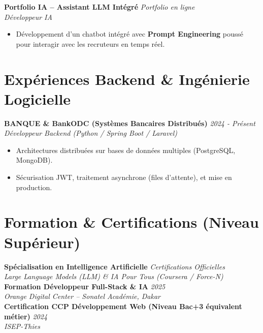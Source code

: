 \documentclass[10pt,a4paper]{article}
\begin{document}
\vspace{0.2cm}

\textbf{\color{dark} Portfolio IA -- Assistant LLM Intégré} \hfill \textit{Portfolio en ligne}\\
\textit{Développeur IA}
\begin{itemize}[leftmargin=0.5cm, label={--}, itemsep=1pt]
    \item Développement d'un chatbot intégré avec \textbf{Prompt Engineering} poussé pour interagir avec les recruteurs en temps réel.
\end{itemize}

\section*{Expériences Backend \& Ingénierie Logicielle}

\textbf{\color{dark} BANQUE \& BankODC (Systèmes Bancaires Distribués)} \hfill \textit{2024 - Présent}\\
\textit{Développeur Backend (Python / Spring Boot / Laravel)}
\begin{itemize}[leftmargin=0.5cm, label={--}, itemsep=1pt]
    \item Architectures distribuées sur bases de données multiples (PostgreSQL, MongoDB).
    \item Sécurisation JWT, traitement asynchrone (files d'attente), et mise en production.
\end{itemize}

\section*{Formation \& Certifications (Niveau Supérieur)}

\textbf{Spécialisation en Intelligence Artificielle} \hfill \textit{Certifications Officielles}\\
\textit{Large Language Models (LLM) \& IA Pour Tous (Coursera / Force-N)}\\
\vspace{0.1cm}
\textbf{Formation Développeur Full-Stack \& IA} \hfill \textit{2025}\\
\textit{Orange Digital Center -- Sonatel Académie, Dakar}\\
\vspace{0.1cm}
\textbf{Certification CCP Développement Web (Niveau Bac+3 équivalent métier)} \hfill \textit{2024}\\
\textit{ISEP-Thies}
\end{document}
